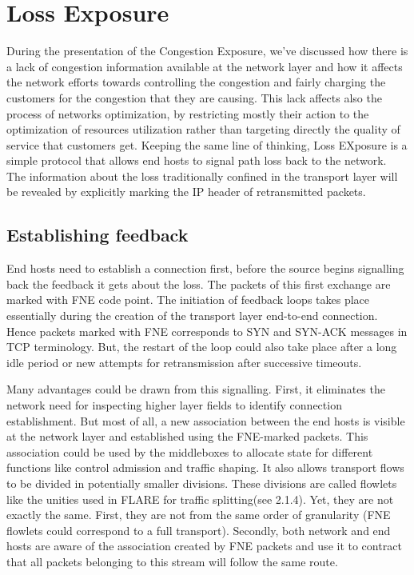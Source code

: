 \section{Loss Exposure}

During the presentation of the Congestion Exposure, we've discussed how there is a lack of congestion information available at the network layer and how it affects the network efforts towards controlling the congestion and fairly charging the customers for the congestion that they are causing. This lack affects also the process of networks optimization, by restricting mostly their action to the optimization of resources utilization rather than targeting directly the quality of service that customers get. Keeping the same line of thinking, Loss EXposure is a simple protocol that allows end hosts to signal path loss back to the network. The information about the loss traditionally confined in the transport layer will be revealed by explicitly marking the IP header of retransmitted  packets.

\subsection{ Establishing feedback}

End hosts need to establish a connection first, before the source begins signalling back the feedback it gets about the loss. The packets of this first exchange are marked with FNE code point. The initiation of  feedback loops takes place essentially during the creation of the transport layer end-to-end connection.  Hence packets marked with FNE corresponds to SYN and SYN-ACK messages in TCP terminology. But, the restart of the loop could also take place after a long idle period or new attempts for retransmission after successive timeouts.

Many advantages could be drawn from this signalling. First, it eliminates the network need for inspecting higher layer fields to identify connection establishment. But most of all, a new  association between the end hosts is visible at the network layer and established using the FNE-marked packets. This association could be used by the middleboxes to allocate state for different functions like control admission and traffic shaping. It also allows transport flows to be divided in potentially smaller divisions. These divisions are called flowlets like the unities used in FLARE for traffic splitting(see 2.1.4). Yet, they are not exactly the same. First, they are not from the same order of granularity (FNE flowlets could correspond to a full transport). Secondly, both network and end hosts are aware of the association created by FNE packets and use it to contract that all packets belonging to this stream will follow the same route.


